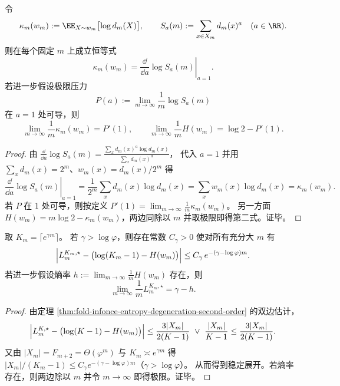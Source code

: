 \begin{proposition}[对数多重度的压力导数恒等式]\label{prop:fold-logmultiplicity-pressure-derivative}
令
\[
\kappa_m(w_m):=\EE_{X\sim w_m}\bigl[\log d_m(X)\bigr],
\qquad
S_a(m):=\sum_{x\in X_m}d_m(x)^a\quad(a\in\RR).
\]
则在每个固定 \(m\) 上成立恒等式
\[
\kappa_m(w_m)=\left.\frac{\dd}{\dd a}\log S_a(m)\right|_{a=1}.
\]
若进一步假设极限压力
\[
P(a):=\lim_{m\to\infty}\frac{1}{m}\log S_a(m)
\]
在 \(a=1\) 处可导，则
\[
\lim_{m\to\infty}\frac{1}{m}\kappa_m(w_m)=P'(1),
\qquad
\lim_{m\to\infty}\frac{1}{m}H(w_m)=\log 2-P'(1).
\]
\end{proposition}
\begin{proof}
由
\(
\frac{\dd}{\dd a}\log S_a(m)=\frac{\sum_x d_m(x)^a\log d_m(x)}{\sum_x d_m(x)^a}
\)，
代入 \(a=1\) 并用 \(\sum_x d_m(x)=2^m\)、\(w_m(x)=d_m(x)/2^m\) 得
\[
\left.\frac{\dd}{\dd a}\log S_a(m)\right|_{a=1}
=\frac{1}{2^m}\sum_x d_m(x)\log d_m(x)
=\sum_x w_m(x)\log d_m(x)
=\kappa_m(w_m).
\]
若 \(P\) 在 \(1\) 处可导，则按定义
\(
P'(1)=\lim_{m\to\infty}\frac{1}{m}\kappa_m(w_m)
\)。
另一方面
\(
H(w_m)=m\log 2-\kappa_m(w_m)
\)，两边同除以 \(m\) 并取极限即得第二式。证毕。
\end{proof}

\begin{corollary}[指数负样本双极限的稳定展开与临界阈值]\label{cor:fold-infonce-exponential-K-stable-expansion}
取 \(K_m=\lceil e^{\gamma m}\rceil\)。
若 \(\gamma>\log\varphi\)，则存在常数 \(C_\gamma>0\) 使对所有充分大 \(m\) 有
\[
\Bigl|L_{m}^{K_m,\star}-\bigl(\log(K_m-1)-H(w_m)\bigr)\Bigr|
\le C_\gamma\,e^{-(\gamma-\log\varphi)m}.
\]
若进一步假设熵率 \(h:=\lim_{m\to\infty}\frac{1}{m}H(w_m)\) 存在，则
\[
\lim_{m\to\infty}\frac{1}{m}L_{m}^{K_m,\star}=\gamma-h.
\]
\end{corollary}
\begin{proof}
由定理 \ref{thm:fold-infonce-entropy-degeneration-second-order} 的双边估计，
\[
\Bigl|L_{m}^{K,\star}-\bigl(\log(K-1)-H(w_m)\bigr)\Bigr|
\le
\frac{3|X_m|}{2(K-1)}\ \vee\ \frac{|X_m|}{K-1}
\le
\frac{3|X_m|}{2(K-1)}.
\]
又由 \(|X_m|=F_{m+2}=\Theta(\varphi^m)\) 与 \(K_m\asymp e^{\gamma m}\) 得
\(
|X_m|/(K_m-1)\le C_\gamma e^{-(\gamma-\log\varphi)m}
\)（\(\gamma>\log\varphi\)）。
从而得到稳定展开。若熵率存在，则两边除以 \(m\) 并令 \(m\to\infty\) 即得极限。证毕。
\end{proof}



\endinput

